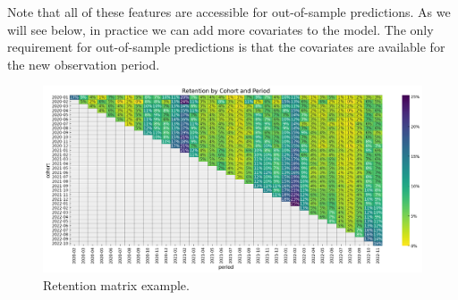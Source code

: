 \documentclass[11pt]{amsart}
\begin{document}
Note that all of these features are accessible for out-of-sample predictions.
As we will see below, in practice we can add more covariates to the model.
The only requirement for out-of-sample predictions is that the covariates are available
for the new observation period. \\

\begin{figure}
    \centering
    \includegraphics[width=\textwidth]{images/revenue_retention_17_0.png}
    \caption{Retention matrix example.}
    \label{fig:retention_matrix}
\end{figure}
\end{document}
